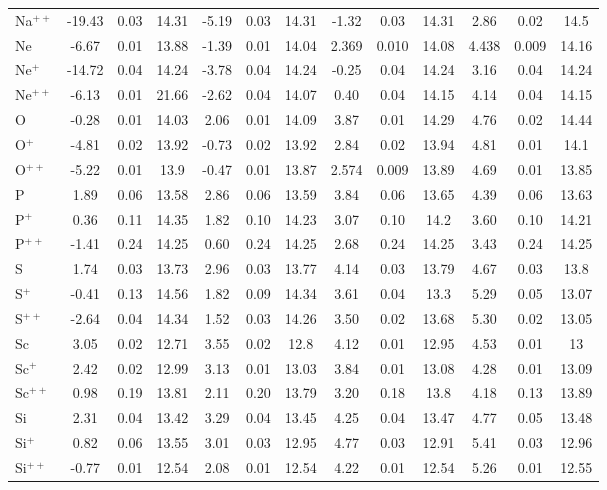 \begin{longtable}{l!{\vrule width 0.25pt}ccc!{\vrule width 0.25pt}ccc!{\vrule width 0.25pt}ccc!{\vrule width 0.25pt}ccc}
Na$^{++}$ & -19.43 & 0.03 & 14.31 & -5.19 & 0.03 & 14.31 & -1.32 & 0.03 & 14.31 & 2.86 & 0.02 & 14.5 \\
Ne & -6.67 & 0.01 & 13.88 & -1.39 & 0.01 & 14.04 & 2.369 & 0.010 & 14.08 & 4.438 & 0.009 & 14.16 \\
Ne$^+$ & -14.72 & 0.04 & 14.24 & -3.78 & 0.04 & 14.24 & -0.25 & 0.04 & 14.24 & 3.16 & 0.04 & 14.24 \\
Ne$^{++}$ & -6.13 & 0.01 & 21.66 & -2.62 & 0.04 & 14.07 & 0.40 & 0.04 & 14.15 & 4.14 & 0.04 & 14.15 \\
O & -0.28 & 0.01 & 14.03 & 2.06 & 0.01 & 14.09 & 3.87 & 0.01 & 14.29 & 4.76 & 0.02 & 14.44 \\
O$^+$ & -4.81 & 0.02 & 13.92 & -0.73 & 0.02 & 13.92 & 2.84 & 0.02 & 13.94 & 4.81 & 0.01 & 14.1 \\
O$^{++}$ & -5.22 & 0.01 & 13.9 & -0.47 & 0.01 & 13.87 & 2.574 & 0.009 & 13.89 & 4.69 & 0.01 & 13.85 \\
P & 1.89 & 0.06 & 13.58 & 2.86 & 0.06 & 13.59 & 3.84 & 0.06 & 13.65 & 4.39 & 0.06 & 13.63 \\
P$^+$ & 0.36 & 0.11 & 14.35 & 1.82 & 0.10 & 14.23 & 3.07 & 0.10 & 14.2 & 3.60 & 0.10 & 14.21 \\
P$^{++}$ & -1.41 & 0.24 & 14.25 & 0.60 & 0.24 & 14.25 & 2.68 & 0.24 & 14.25 & 3.43 & 0.24 & 14.25 \\
S & 1.74 & 0.03 & 13.73 & 2.96 & 0.03 & 13.77 & 4.14 & 0.03 & 13.79 & 4.67 & 0.03 & 13.8 \\
S$^+$ & -0.41 & 0.13 & 14.56 & 1.82 & 0.09 & 14.34 & 3.61 & 0.04 & 13.3 & 5.29 & 0.05 & 13.07 \\
S$^{++}$ & -2.64 & 0.04 & 14.34 & 1.52 & 0.03 & 14.26 & 3.50 & 0.02 & 13.68 & 5.30 & 0.02 & 13.05 \\
Sc & 3.05 & 0.02 & 12.71 & 3.55 & 0.02 & 12.8 & 4.12 & 0.01 & 12.95 & 4.53 & 0.01 & 13 \\
Sc$^+$ & 2.42 & 0.02 & 12.99 & 3.13 & 0.01 & 13.03 & 3.84 & 0.01 & 13.08 & 4.28 & 0.01 & 13.09 \\
Sc$^{++}$ & 0.98 & 0.19 & 13.81 & 2.11 & 0.20 & 13.79 & 3.20 & 0.18 & 13.8 & 4.18 & 0.13 & 13.89 \\
Si & 2.31 & 0.04 & 13.42 & 3.29 & 0.04 & 13.45 & 4.25 & 0.04 & 13.47 & 4.77 & 0.05 & 13.48 \\
Si$^+$ & 0.82 & 0.06 & 13.55 & 3.01 & 0.03 & 12.95 & 4.77 & 0.03 & 12.91 & 5.41 & 0.03 & 12.96 \\
Si$^{++}$ & -0.77 & 0.01 & 12.54 & 2.08 & 0.01 & 12.54 & 4.22 & 0.01 & 12.54 & 5.26 & 0.01 & 12.55 \\

\end{longtable}
